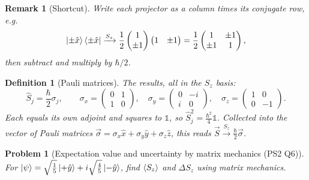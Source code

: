 \documentclass{article}
\newtheorem{definition}{Definition}
\newtheorem{problem}{Problem}
\newtheorem{remark}{Remark}
\newcommand{\id}{\mathds{1}}
\begin{document}
\begin{remark}[Shortcut]
    Write each projector as a column times its conjugate row, e.g.
    \[\ket{\pm\hat{x}}\bra{\pm\hat{x}} \xrightarrow{S_z} \frac{1}{2}\begin{pmatrix} 1 \\ \pm1 \end{pmatrix}\begin{pmatrix} 1 & \pm1 \end{pmatrix} = \frac{1}{2}\begin{pmatrix} 1 & \pm1 \\ \pm1 & 1 \end{pmatrix},\]
    then subtract and multiply by $\hbar/2$.
\end{remark}
\begin{definition}[Pauli matrices]
    The results, all in the $S_z$ basis:
    \begin{equation}
        \hat{S}_j = \frac{\hbar}{2}\sigma_j, \qquad
        \sigma_x = \begin{pmatrix} 0 & 1 \\ 1 & 0 \end{pmatrix}, \quad
        \sigma_y = \begin{pmatrix} 0 & -i \\ i & 0 \end{pmatrix}, \quad
        \sigma_z = \begin{pmatrix} 1 & 0 \\ 0 & -1 \end{pmatrix}.
    \end{equation}
    Each equals its own adjoint and squares to $\id$, so $\hat{S}_j^2 = \tfrac{\hbar^2}{4}\id$. Collected into the vector of Pauli matrices $\vec{\sigma} = \sigma_x\hat{x} + \sigma_y\hat{y} + \sigma_z\hat{z}$, this reads $\vec{S} \xrightarrow{S_z} \frac{\hbar}{2}\vec{\sigma}$.
\end{definition}
\begin{problem}[Expectation value and uncertainty by matrix mechanics (PS2 Q6)]
    For $\ket{\psi} = \sqrt{\tfrac{1}{5}}\ket{+\hat{y}} + i\sqrt{\tfrac{4}{5}}\ket{-\hat{y}}$, find $\braket{S_z}$ and $\Delta S_z$ using matrix mechanics.
\end{problem}
\end{document}
